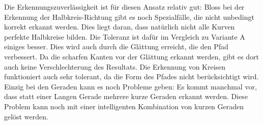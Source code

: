 Die Erkennungszuverlässigkeit ist für diesen Ansatz relativ gut: Bloss bei der Erkennung der Halbkreis-Richtung gibt es noch Spezialfälle, die nicht unbedingt korrekt erkannt werden. Dies liegt daran, dass natürlich nicht alle Kurven perfekte Halbkreise bilden. Die Toleranz ist dafür im Vergleich zu Variante A einiges besser. Dies wird auch durch die Glättung erreicht, die den Pfad verbessert. Da die scharfen Kanten vor der Glättung erkannt werden, gibt es dort auch keine Verschlechterung des Resultats. Die Erkennung von Kreisen funktioniert auch sehr tolerant, da die Form des Pfades nicht berücksichtigt wird. Einzig bei den Geraden kann es noch Probleme geben: Es kommt manchmal vor, dass statt einer Langen Gerade mehrere kurze Geraden erkannt werden. Diese Problem kann noch mit einer intelligenten Kombination von kurzen Geraden gelöst werden.
